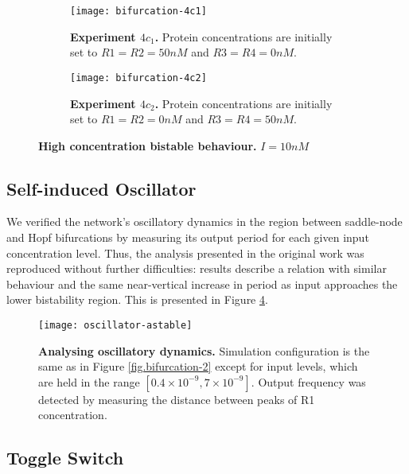     \begin{figure}[!htb]
      \centering
      \begin{subfigure}[t]{0.45\textwidth}
        \centering
        \texttt{[image: bifurcation-4c1]}
        \caption{\textbf{Experiment $4c_{1}$.} Protein concentrations are initially set to $R1 = R2 = 50nM$ and $R3 = R4 = 0nM$.}
        \label{fig.bifurcation-4c1}
      \end{subfigure}
      \hspace{1em}
      \begin{subfigure}[t]{0.45\textwidth}
        \centering
        \texttt{[image: bifurcation-4c2]}
        \caption{\textbf{Experiment $4c_{2}$.} Protein concentrations are initially set to $R1 = R2 = 0nM$ and $R3 = R4 = 50nM$.}
        \label{fig.bifurcation-4c2}
      \end{subfigure}
      \caption{\textbf{High concentration bistable behaviour.} $I = 10 nM$}
      \label{fig.bifurcation-4}
    \end{figure}


  \subsection{Self-induced Oscillator}

    We verified the network's oscillatory dynamics in the region between saddle-node and Hopf bifurcations by measuring its output period for each given input concentration level.
    Thus, the analysis presented in the original work was reproduced without further difficulties: results describe a relation with similar behaviour and the same near-vertical increase in period as input approaches the lower bistability region.
    This is presented in Figure \ref{fig.oscillator-astable}.

    \begin{figure}[!htb]
      \centering
      \texttt{[image: oscillator-astable]}
      \caption{\textbf{Analysing oscillatory dynamics.} Simulation configuration is the same as in Figure \ref{fig.bifurcation-2} except for input levels, which are held in the range $[0.4 \times 10^{-9}, 7 \times 10^{-9}]$. Output frequency was detected by measuring the distance between peaks of R1 concentration.}
      \label{fig.oscillator-astable}
    \end{figure}


  \subsection{Toggle Switch}

